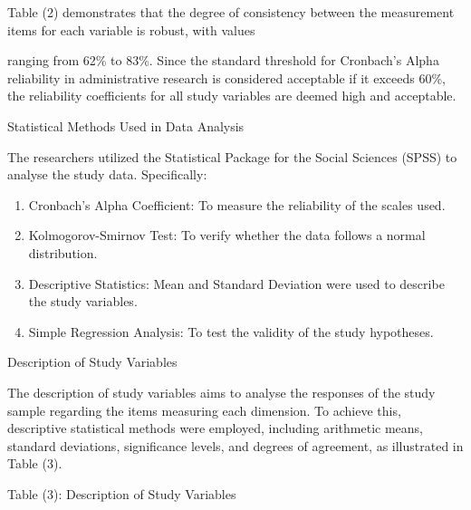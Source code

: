 \documentclass[10pt]{NSP1}
\begin{document}
Table (2) demonstrates that the degree of consistency between the measurement items for each variable is robust, with values

ranging from 62\% to 83\%. Since the standard threshold for Cronbach’s Alpha reliability in administrative research is considered acceptable if it exceeds 60\%, the reliability coefficients for all study variables are deemed high and acceptable.

Statistical Methods Used in Data Analysis

The researchers utilized the Statistical Package for the Social Sciences (SPSS) to analyse the study data. Specifically:

\begin{enumerate}
  \item Cronbach’s Alpha Coefficient: To measure the reliability of the scales used.
  \item Kolmogorov-Smirnov Test: To verify whether the data follows a normal distribution.
  \item Descriptive Statistics: Mean and Standard Deviation were used to describe the study variables.
  \item Simple Regression Analysis: To test the validity of the study hypotheses.
\end{enumerate}

Description of Study Variables

The description of study variables aims to analyse the responses of the study sample regarding the items measuring each dimension. To achieve this, descriptive statistical methods were employed, including arithmetic means, standard deviations, significance levels, and degrees of agreement, as illustrated in Table (3).

Table (3): Description of Study Variables
\end{document}

